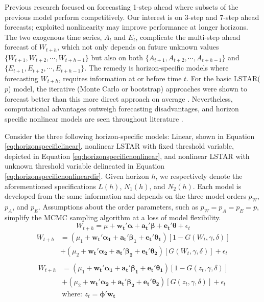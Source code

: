 Previous research focused on forecasting 1-step ahead where subsets of the previous model perform competitively. Our interest is on 3-step and 7-step ahead forecasts; exploited nonlinearity may improve performance at longer horizons. The two exogenous time series, $A_t$ and $E_t$, complicate the multi-step ahead forecast of $W_{t+h}$, which not only depends on future unknown values $\{W_{t+1},W_{t+2},\cdots,W_{t+h-1}\}$ but also on both $\{A_{t+1},A_{t+2},\cdots,A_{t+h-1}\}$ and $\{E_{t+1},E_{t+2},\cdots,E_{t+h-1}\}$. The remedy is horizon-specific models where forecasting $W_{t+h}$, requires information at or before time $t$. For the basic LSTAR($p$) model, the iterative (Monte Carlo or bootstrap) approaches were shown to forecast better than this more direct approach on average \citep{Lin1994}. Nevertheless, computational advantages outweigh forecasting disadvantages, and horizon specific nonlinear models are seen throughout literature \citep{Stock1998a,Marcellino2006}.
 
Consider the three following horizon-specific models: Linear, shown in Equation \ref{eq:horizonspecificlinear}, nonlinear LSTAR with fixed threshold variable, depicted in Equation \ref{eq:horizonspecificnonlinear}, and nonlinear LSTAR with unknown threshold variable delineated in Equation \ref{eq:horizonspecificnonlineardir}. Given horizon $h$, we respectively denote the aforementioned specifications $L(h)$, $N_1(h)$, and $N_2(h)$. Each model is developed from the same information and depends on the three model orders $p_W$, $p_A$, and $p_E$. Assumptions about the order parameters, such as $p_W=p_A=p_E=p$, simplify the MCMC sampling algorithm at a loss of model flexibility. 
  \begin{equation}
	\label{eq:horizonspecificlinear}
	W_{t+h}=\mu+\bm{w_t}'\bm{\alpha} + \bm{a_t}'\bm{\beta} +  \bm{e_t}'\bm{\theta}+\epsilon_t
 \end{equation} 
   \begin{equation}
   \begin{split}
	\label{eq:horizonspecificnonlinear}
	W_{t+h}&=(\mu_1+\bm{w_t}'\bm{\alpha_1} + \bm{a_t}'\bm{\beta_1} +  \bm{e_t}'\bm{\theta_1})[1-G(W_t,\gamma,\delta)]\\
	& + (\mu_2+\bm{w_t}'\bm{\alpha_2} + \bm{a_t}'\bm{\beta_2} +  \bm{e_t}'\bm{\theta_2})[G(W_t,\gamma,\delta)]+\epsilon_t\\
	\end{split}
 \end{equation}
     \begin{equation}
   \begin{split}
	\label{eq:horizonspecificnonlineardir}
	W_{t+h}&=(\mu_1+\bm{w_t}'\bm{\alpha_1} + \bm{a_t}'\bm{\beta_1} +  \bm{e_t}'\bm{\theta_1})[1-G(z_t,\gamma,\delta)]\\
	& + (\mu_2+\bm{w_t}'\bm{\alpha_2} + \bm{a_t}'\bm{\beta_2} +  \bm{e_t}'\bm{\theta_2})[G(z_t,\gamma,\delta)]+\epsilon_t\\
	& \textrm{where: } z_t=\bm{\phi}'\bm{w_t}\\
	\end{split}
 \end{equation}
 
